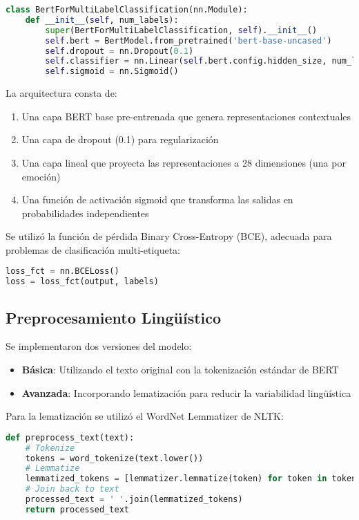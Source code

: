 \documentclass[12pt,a4paper]{report}
\begin{document}
\begin{lstlisting}[language=Python]
class BertForMultiLabelClassification(nn.Module):
    def __init__(self, num_labels):
        super(BertForMultiLabelClassification, self).__init__()
        self.bert = BertModel.from_pretrained('bert-base-uncased')
        self.dropout = nn.Dropout(0.1)
        self.classifier = nn.Linear(self.bert.config.hidden_size, num_labels)
        self.sigmoid = nn.Sigmoid()
\end{lstlisting}

La arquitectura consta de:
\begin{enumerate}
  \item Una capa BERT base pre-entrenada que genera representaciones contextuales
  \item Una capa de dropout (0.1) para regularización
  \item Una capa lineal que proyecta las representaciones a 28 dimensiones (una por emoción)
  \item Una función de activación sigmoid que transforma las salidas en probabilidades independientes
\end{enumerate}

Se utilizó la función de pérdida Binary Cross-Entropy (BCE), adecuada para problemas de clasificación multi-etiqueta:

\begin{lstlisting}[language=Python]
loss_fct = nn.BCELoss()
loss = loss_fct(output, labels)
\end{lstlisting}

\subsection{Preprocesamiento Lingüístico}

Se implementaron dos versiones del modelo:
\begin{itemize}
  \item \textbf{Básica}: Utilizando el texto original con la tokenización estándar de BERT
  \item \textbf{Avanzada}: Incorporando lematización para reducir la variabilidad lingüística
\end{itemize}

Para la lematización se utilizó el WordNet Lemmatizer de NLTK:

\begin{lstlisting}[language=Python]
def preprocess_text(text):
    # Tokenize
    tokens = word_tokenize(text.lower())
    # Lemmatize
    lemmatized_tokens = [lemmatizer.lemmatize(token) for token in tokens]
    # Join back to text
    processed_text = ' '.join(lemmatized_tokens)
    return processed_text
\end{lstlisting}
\end{document}

